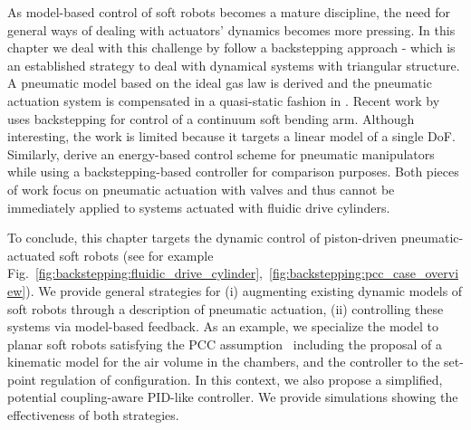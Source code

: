 As model-based control of soft robots becomes a mature discipline, the need for general ways of dealing with actuators' dynamics becomes more pressing. In this chapter we deal with this challenge by follow a backstepping approach - which is an established strategy to deal with dynamical systems with triangular structure. %
%
A pneumatic model based on the ideal gas law is derived and the pneumatic actuation system is compensated in a quasi-static fashion in \citet{falkenhahn2016dynamic}.
%
%
%
Recent work by \citet{wang2019parameter} uses backstepping for control of a continuum soft bending arm. Although interesting, the work is limited because it targets a linear model of a single DoF.
Similarly, \citet{franco2021nonlinear} derive an energy-based control scheme for pneumatic manipulators while using a backstepping-based controller for comparison purposes.
% 
Both pieces of work focus on pneumatic actuation with valves and thus cannot be immediately applied to systems actuated with fluidic drive cylinders.

To conclude, this chapter targets the dynamic control of piston-driven pneumatic-actuated soft robots (see for example Fig.~\ref{fig:backstepping:fluidic_drive_cylinder},~\ref{fig:backstepping:pcc_case_overview}). 
We provide general strategies for (i) augmenting existing dynamic models of soft robots through a description of pneumatic actuation, (ii) controlling these systems via model-based feedback. 
As an example, we specialize the model to planar soft robots satisfying the \gls{PCC} assumption~\citep{della2020model} including the proposal of a kinematic model for the air volume in the chambers, and the controller to the set-point regulation of configuration. In this context, we also propose a simplified, potential coupling-aware PID-like controller. We provide simulations showing the effectiveness of both strategies.


